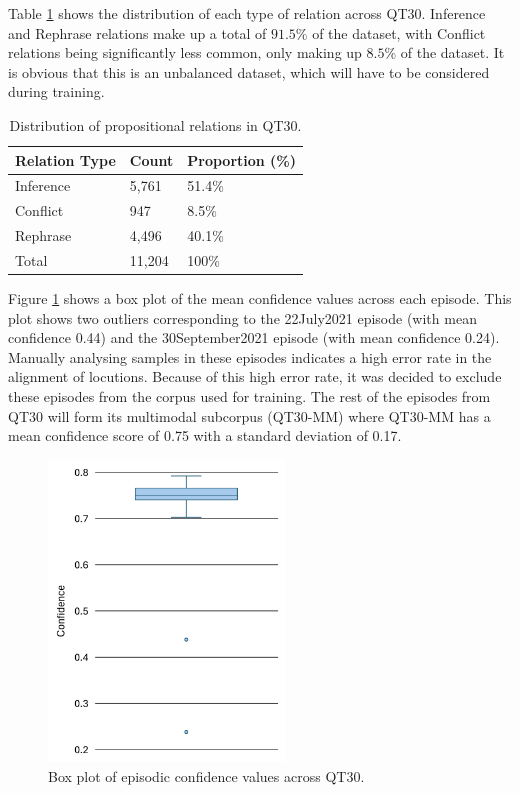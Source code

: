 \documentclass[twocolumn]{article}
\begin{document}
Table \ref{tbl:qt-rel} shows the distribution of each type of relation
across QT30. Inference and Rephrase relations make up a total of
\(91.5\%\) of the dataset, with Conflict relations being significantly
less common, only making up \(8.5\%\) of the dataset. It is obvious that
this is an unbalanced dataset, which will have to be considered during
training.

\begin{table}[h]
\centering
\caption{Distribution of propositional relations in QT30. \label{tbl:qt-rel}}
\begin{tabular}{|l|ll|}
\hline
Relation Type & Count & Proportion (\%) \\ \hline
Inference     & 5,761       & 51.4\%    \\
Conflict      & 947         & 8.5\%     \\
Rephrase      & 4,496       & 40.1\%    \\ \hline
Total         & 11,204      & 100\%     \\ \hline
\end{tabular}
\end{table}

Figure \ref{fig:qt30-confidence-box} shows a box plot of the mean
confidence values across each episode. This plot shows two outliers
corresponding to the 22July2021 episode (with mean confidence 0.44) and
the 30September2021 episode (with mean confidence 0.24). Manually
analysing samples in these episodes indicates a high error rate in the
alignment of locutions. Because of this high error rate, it was decided
to exclude these episodes from the corpus used for training. The rest of
the episodes from QT30 will form its multimodal subcorpus (QT30-MM)
where QT30-MM has a mean confidence score of 0.75 with a standard
deviation of 0.17.

\begin{figure}[h]
\centering
\includegraphics[height=8cm]{confidence-box}
\caption{Box plot of episodic confidence values across QT30. \label{fig:qt30-confidence-box}}
\end{figure}
\end{document}
